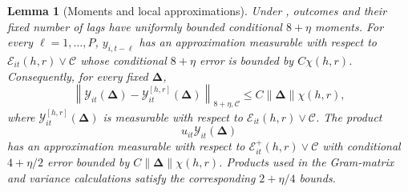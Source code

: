 \documentclass[11pt]{article}
\numberwithin{equation}{section}
\newtheorem{lemma}{Lemma}
\theoremstyle{remark}
\newcommand{\bDelta}{\bm\Delta}
\begin{document}
\begin{lemma}[Moments and local approximations]
\label{lem:localization}
Under , outcomes and their fixed number of lags have uniformly bounded conditional $8+\eta$ moments. For every $\ell=1,\ldots,P$, $y_{i,t-\ell}$ has an approximation measurable with respect to $\mathscr E_{it}(h,r)\vee\mathscr C$ whose conditional $8+\eta$ error is bounded by $C\chi(h,r)$. Consequently, for every fixed $\bDelta$,
$$
\left\|
\mathcal Y_{it}(\bDelta)
-
\mathcal Y_{it}^{[h,r]}(\bDelta)
\right\|_{8+\eta,\mathscr C}
\le
C\|\bDelta\|\chi(h,r),
$$
where $\mathcal Y_{it}^{[h,r]}(\bDelta)$ is measurable with respect to $\mathscr E_{it}(h,r)\vee\mathscr C$. The product
$$
u_{it}\mathcal Y_{it}(\bDelta)
$$
has an approximation measurable with respect to $\mathscr E_{it}^{+}(h,r)\vee\mathscr C$ with conditional $4+\eta/2$ error bounded by $C\|\bDelta\|\chi(h,r)$. Products used in the Gram-matrix and variance calculations satisfy the corresponding $2+\eta/4$ bounds.
\end{lemma}
\end{document}

